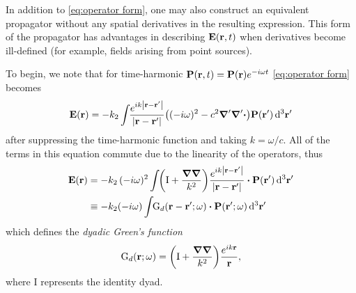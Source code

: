 In addition to \cref{eq:operator form}, one may also construct an equivalent propagator without any spatial derivatives in the resulting expression.
This form of the propagator has advantages in describing $\vb{E}(\vb{r}, t)$ when derivatives become ill-defined (for example, fields arising from point sources).

To begin, we note that for time-harmonic $\vb{P}(\vb{r}, t) = \vb{P}(\vb{r})e^{-i \omega t}$ \cref{eq:operator form} becomes
\begin{equation}
  \vb{E}(\vb{r}) = -k_2 \int_{} \kern0.1em \frac{e^{i k \abs{\vb{r} - \vb{r}'}}}{\abs{\vb{r} - \vb{r}'}} \qty((-i\omega)^2 - c^2 \grad'\grad'\boldsymbol{\cdot}) \vb{P}(\vb{r}') \dd[3]{\vb{r}'}
  \label{eq:time harmonic}
\end{equation}
after suppressing the time-harmonic function and taking $k = \omega/c$.
All of the terms in this equation commute due to the linearity of the operators, thus
\begin{equation}
  \begin{aligned}
    \vb{E}(\vb{r}) &= -k_2 \, (-i\omega)^2 \int_{} \kern0.1em \qty(\mathrm{I} + \frac{\grad\grad}{k^2}) \frac{e^{i k \abs{\vb{r} - \vb{r}'}}}{\abs{\vb{r} - \vb{r}'}} \boldsymbol{\cdot} \vb{P}(\vb{r}') \dd[3]{\vb{r}'} \\
    &\equiv -k_2 (-i \omega) \int_{} \kern0.1em \mathrm{G}_d(\vb{r} - \vb{r}'; \omega) \boldsymbol{\cdot} \vb{P}(\vb{r}'; \omega) \dd[3]{\vb{r}'}
  \end{aligned}
  \label{eq:dyadic integral}
\end{equation}
which defines the \emph{dyadic Green's function}
\begin{equation}
  \mathrm{G}_d(\vb{r}; \omega) = \qty(\mathrm{I} + \frac{\grad\grad}{k^2}) \frac{e^{ik\vb{r}}}{\vb{r}},
  \label{eq:dyadic}
\end{equation}
where $\mathrm{I}$ represents the identity dyad.

